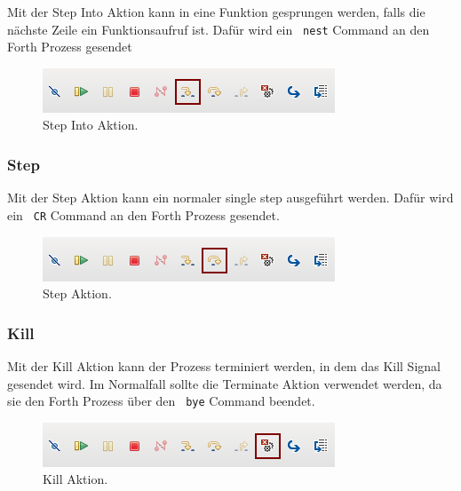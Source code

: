 Mit der Step Into Aktion kann in eine Funktion gesprungen werden, falls die nächste Zeile ein Funktionsaufruf ist. Dafür wird ein \verb! nest! Command an den Forth Prozess gesendet

\begin{figure}[H]
	\centering
		\includegraphics[scale=1]{debugger/stepinto.png}
		\caption{Step Into Aktion.}
		\label{fig:extensionpoint}
\end{figure}

\subsubsection{Step}

Mit der Step Aktion kann ein normaler single step ausgeführt werden. Dafür wird ein \verb! CR! Command an den Forth Prozess gesendet.

\begin{figure}[H]
	\centering
		\includegraphics[scale=1]{debugger/step.png}
		\caption{Step Aktion.}
		\label{fig:extensionpoint}
\end{figure}

\subsubsection{Kill}

Mit der Kill Aktion kann der Prozess terminiert werden, in dem das Kill Signal gesendet wird. Im Normalfall sollte die Terminate Aktion verwendet werden, da sie den Forth Prozess über den \verb! bye! Command beendet.

\begin{figure}[H]
	\centering
		\includegraphics[scale=1]{debugger/kill.png}
		\caption{Kill Aktion.}
		\label{fig:extensionpoint}
\end{figure}

